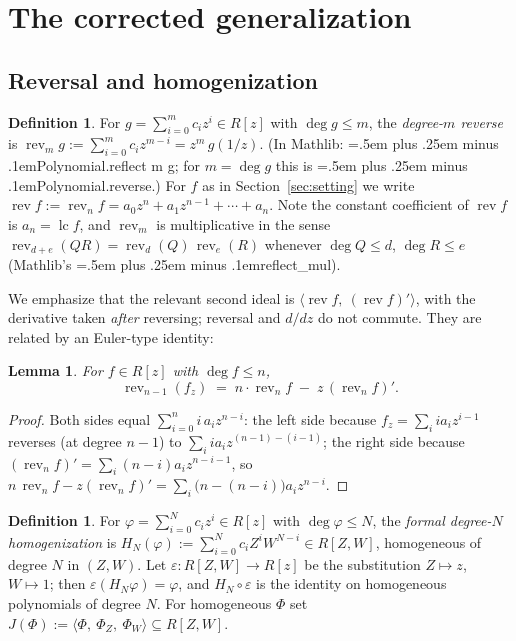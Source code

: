 \documentclass[11pt,a4paper]{article}
\newtheorem{lemma}[theorem]{Lemma}
\theoremstyle{definition}
\newtheorem{definition}[theorem]{Definition}
\newcommand{\lc}{\operatorname{lc}}
\newcommand{\rev}{\operatorname{rev}}
\newcommand{\ideal}[1]{\langle #1\rangle}
\newcommand{\code}[1]{{\ttfamily\spaceskip=.5em plus .25em minus .1em\relax #1}}
\begin{document}
\section{The corrected generalization}\label{sec:corrected}

\subsection{Reversal and homogenization}

\begin{definition}\label{def:rev}
For $g = \sum_{i=0}^{m} c_i z^i \in R[z]$ with $\deg g \leq m$, the
\emph{degree-$m$ reverse} is $\rev_m g := \sum_{i=0}^{m} c_i z^{m-i}
= z^m\, g(1/z)$. (In Mathlib: \code{Polynomial.reflect m g}; for $m = \deg g$
this is \code{Polynomial.reverse}.) For $f$ as in
Section~\ref{sec:setting} we write $\rev f := \rev_n f = a_0 z^n + a_1
z^{n-1} + \cdots + a_n$. Note the constant coefficient of $\rev f$ is
$a_n = \lc f$, and $\rev_m$ is multiplicative in the sense
$\rev_{d+e}(QR) = \rev_d(Q)\,\rev_e(R)$ whenever $\deg Q \le d$, $\deg R \le e$
(Mathlib's \code{reflect\_mul}).
\end{definition}

We emphasize that the relevant second ideal is
$\ideal{\rev f,\ (\rev f)'}$, with the derivative taken \emph{after}
reversing; reversal and $d/dz$ do not commute. They are related by an
Euler-type identity:

\begin{lemma}\label{lem:euler}
For $f \in R[z]$ with $\deg f \leq n$,
\[
  \rev_{n-1}(f_z) \;=\; n \cdot \rev_n f \;-\; z\,(\rev_n f)' .
\]
\end{lemma}

\begin{proof}
Both sides equal $\sum_{i=0}^n i\, a_i z^{n-i}$: the left side because
$f_z = \sum_i i a_i z^{i-1}$ reverses (at degree $n-1$) to
$\sum_i i a_i z^{(n-1)-(i-1)}$; the right side because $(\rev_n f)' =
\sum_i (n-i) a_i z^{n-i-1}$, so $n\,\rev_n f - z (\rev_n f)' =
\sum_i \bigl(n-(n-i)\bigr) a_i z^{n-i}$.
\end{proof}

\begin{definition}\label{def:homog}
For $\varphi = \sum_{i=0}^N c_i z^i \in R[z]$ with $\deg\varphi \leq N$, the
\emph{formal degree-$N$ homogenization} is
$H_N(\varphi) := \sum_{i=0}^N c_i Z^i W^{N-i} \in R[Z,W]$, homogeneous of
degree $N$ in $(Z,W)$. Let $\varepsilon : R[Z,W] \to R[z]$ be the substitution
$Z \mapsto z$, $W \mapsto 1$; then $\varepsilon(H_N\varphi) = \varphi$, and
$H_N \circ \varepsilon$ is the identity on homogeneous polynomials of degree
$N$. For homogeneous $\Phi$ set
$J(\Phi) := \ideal{\Phi,\ \Phi_Z,\ \Phi_W} \subseteq R[Z,W]$.
\end{definition}
\end{document}
